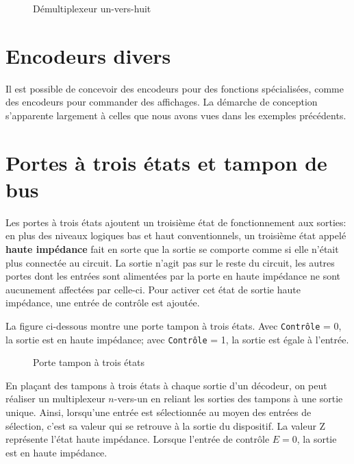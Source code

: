 \documentclass[letter, oneside]{book}
\begin{document}
\begin{figure}[htbp]
\centering

\caption{\label{fig:org4e054f1}Démultiplexeur un-vers-huit}
\end{figure}

\section{Encodeurs divers}
\label{sec:org522df4a}

Il est possible de concevoir des encodeurs pour des fonctions
spécialisées, comme des encodeurs pour commander des affichages. La
démarche de conception s'apparente largement à celles que nous avons
vues dans les exemples précédents.


\section{Portes à trois états et tampon de bus}
\label{sec:orgc0c5d7b}

Les portes à trois états ajoutent un troisième état de fonctionnement
aux sorties: en plus des niveaux logiques bas et haut conventionnels,
un troisième état appelé \textbf{haute impédance} fait en sorte que la sortie
se comporte comme si elle n'était plus connectée au circuit. La sortie
n'agit pas sur le reste du circuit, les autres portes dont les entrées
sont alimentées par la porte en haute impédance ne sont aucunement
affectées par celle-ci. Pour activer cet état de sortie
haute impédance, une entrée de contrôle est ajoutée.


La figure ci-dessous montre une porte tampon à trois états. Avec
\texttt{Contrôle} = 0, la sortie est en haute impédance; avec  \texttt{Contrôle} = 1,
la sortie est égale à l'entrée.

\begin{figure}[htbp]
\centering

\caption{\label{fig:org3fcbb42}Porte tampon à trois états}
\end{figure}

En plaçant des tampons à trois états à chaque sortie d'un décodeur, on
peut réaliser un multiplexeur \(n\)-vers-un en reliant les sorties des
tampons à une sortie unique. Ainsi, lorsqu'une entrée est
sélectionnée au moyen des entrées de sélection, c'est sa valeur qui se
retrouve à la sortie du dispositif. La valeur Z représente l'état
haute impédance.  Lorsque l'entrée de contrôle \(E = 0\), la sortie est
en haute impédance.
\end{document}
